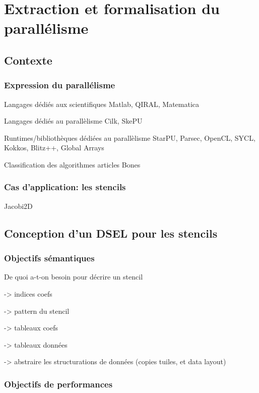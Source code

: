 \documentclass[11pt,onecolumn]{report}
\begin{document}
\chapter{Extraction et formalisation du parallélisme}

\section{Contexte}

\subsection{Expression du parallélisme}

Langages dédiés aux scientifiques Matlab, QIRAL, Matematica

Langages dédiés au parallèlisme Cilk, SkePU

Runtimes/bibliothèques dédiées au parallèlisme StarPU, Parsec, OpenCL, SYCL, Kokkos, Blitz++, Global Arrays

Classification des algorithmes articles Bones

\subsection{Cas d'application: les stencils}

Jacobi2D

\section{Conception d'un DSEL pour les stencils}

\subsection{Objectifs sémantiques}

De quoi a-t-on besoin pour décrire un stencil

-> indices coefs

-> pattern du stencil

-> tableaux coefs

-> tableaux données

-> abstraire les structurations de données (copies tuiles, et data layout)

\subsection{Objectifs de performances}
\end{document}
